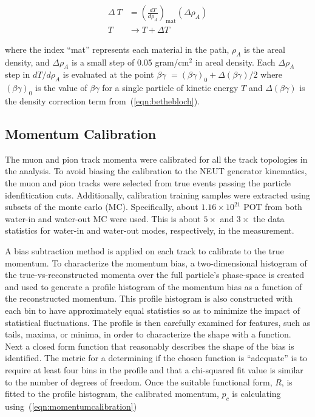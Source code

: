 \begin{align*}
    \Delta~T &= {\left(\frac{dT}{d\rho_{A}}\right)}_\text{mat} {\left(\Delta\rho_{A}\right)}\\
    T &\rightarrow T+\Delta T \,
\end{align*}

\noindent{}where the index ``mat'' represents each material in the path,
$\rho_{A}$ is the areal density, and $\Delta\rho_{A}$ is a
small step of 0.05 gram/cm$^2$ in areal density. Each $\Delta\rho_{A}$ step in $dT/d\rho_{A}$ is
evaluated at the point $\beta\gamma$ $= {(\beta\gamma)}_0 +
\Delta(\beta\gamma)/2$ where ${(\beta\gamma)}_0$ is the value of $\beta\gamma$
for a single particle of kinetic energy $T$ and $\Delta(\beta\gamma)$ is the density correction term from~(\ref{eqn:bethebloch}).

\subsection{Momentum Calibration}\label{subsec:MomToolSubsamples}

The muon and pion track momenta were calibrated for all the track topologies in the analysis.
To avoid biasing the calibration to the NEUT generator kinematics,
the muon and pion tracks were selected from true events passing the particle idenfitication cuts.
Additionally, calibration training samples were extracted using subsets of the monte carlo (MC). Specifically,
about $1.16\times10^{21}$ POT from both water-in and water-out MC were used.
This is about $5\times$ and $3\times$ the data statistics for water-in and water-out modes, respectively, in the measurement.

A bias subtraction method is applied on each track to calibrate to the true
momentum. To characterize the momentum bias, a two-dimensional
histogram of the true-vs-reconstructed momenta over the full
particle's phase-space is created and used to generate a profile
histogram of the momentum bias as a function of the reconstructed
momentum. This profile histogram is also constructed with each bin to
have approximately equal statistics so as to minimize the impact of
statistical fluctuations. The profile is then carefully examined for
features, such as tails, maxima, or minima, in order to characterize
the shape with a function. Next a closed form function that reasonably describes
the shape of the bias is identified. The metric for a determining if
the chosen function is ``adequate'' is to require at least four bins in
the profile and that a chi-squared fit value is similar to the number of degrees of freedom.
Once the suitable functional form, $R$, is fitted to the profile
histogram, the calibrated momentum, $p_c$ is calculating using~(\ref{eqn:momentumcalibration})

